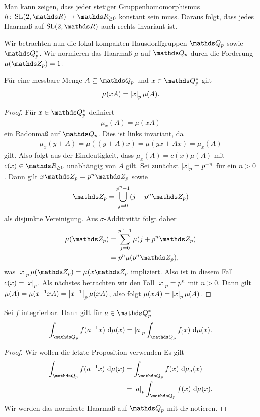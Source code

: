 \begin{bsp}
Man kann zeigen, dass jeder stetiger Gruppenhomomorphismus $h \colon \SL(2,\R)\to \R_{\geq 0}$ konstant sein muss.
Daraus folgt, dass jedes Haarmaß auf $\SL(2,\R)$ auch rechts invariant ist.
\end{bsp}

Wir betrachten nun die lokal kompakten Hausdorffgruppen $\Q_p$ sowie $\Q_p^\ast$.
Wir normieren das Haarmaß $\mu$ auf $\Q_p$ durch die Forderung $\mu(\Z_p)=1$.

\begin{prop}
Für eine messbare Menge $A \subseteq \Q_p$ und $x \in \Q_p^\ast$ gilt
\begin{align*}
\mu(xA)=\left\vert x\right\vert_p\mu(A).
\end{align*}
\end{prop}

\begin{proof}
Für $x \in \Q_p^\ast$ definiert
\begin{align*}
\mu_x(A)=\mu(xA)
\end{align*}
ein Radonmaß auf $\Q_p$.
Dies ist links invariant, da
\begin{align*}
\mu_x(y+A)=\mu((y+A)x)=\mu(yx+Ax)=\mu_x(A)
\end{align*}
gilt.
Also folgt aus der Eindeutigkeit, dass $\mu_x(A)=c(x)\mu(A)$ mit $c(x)\in \R_{\geq 0}$ unabhängig von $A$ gilt.
Sei zunächst $\left\vert x\right\vert_p=p^{-n}$ für ein $n>0$.
Dann gilt $x\Z_p=p^n\Z_p$ sowie 
\begin{align*}
\Z_p=\bigcup_{j=0}^{p^n-1}(j+p^n\Z_p)
\end{align*}
als disjunkte Vereinigung.
Aus $\sigma$-Additivität folgt daher
\begin{align*}
\mu(\Z_p)&=\sum_{j=0}^{p^n-1} \mu(j+p^n\Z_p)\\
&=p^n \mu(p^n \Z_p),
\end{align*}
was $\abs{x}_p\mu(\Z_p)=\mu(x\Z_p$ impliziert.
Also ist in diesem Fall $c(x)=\left\vert x\right\vert_p$.
Als nächstes betrachten wir den Fall $\left\vert x\right\vert_p=p^n$ mit $n>0$.
Dann gilt
$\mu(A)=\mu(x^{-1}xA)=\left\vert x^{-1}\right\vert_p\mu(xA)$,
also folgt $\mu(xA)=\left\vert x\right\vert_p\mu(A)$.
\end{proof}

\begin{cor}
Sei $f$ integrierbar. Dann gilt für $a \in \Q_p^\ast$
\begin{align*}
\int_{\Q_p}f(a^{-1}x)~\mathrm{d}\mu(x)=\abs{a}_p\int_{\Q_p}f_(x)~\mathrm{d}\mu(x).
\end{align*}
\end{cor}
\begin{proof}
Wir wollen die letzte Proposition verwenden
Es gilt 
\begin{align*}
\int_{\Q_p}f(a^{-1}x)~\mathrm{d}\mu(x)&=\int_{\Q_p} f(x)~\mathrm{d}\mu_a(x)\\
&=\abs{a}_p \int_{\Q_p} f(x)~\mathrm{d}\mu(x).
\end{align*}
Wir werden das normierte Haarmaß auf $\Q_p$ mit $\mathrm{d}x$ notieren.
\end{proof}

